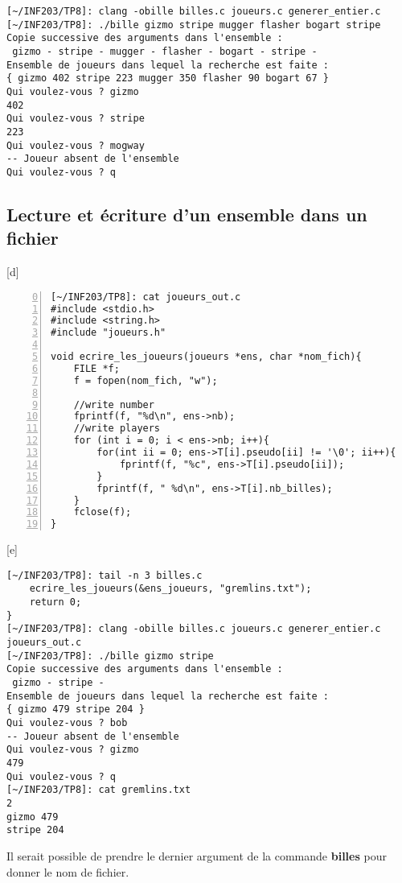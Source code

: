 \documentclass[12pt,a4paper,notitlepage,colorinlistoftodos]{article}
\begin{document}
\begin{lstlisting}
[~/INF203/TP8]: clang -obille billes.c joueurs.c generer_entier.c
[~/INF203/TP8]: ./bille gizmo stripe mugger flasher bogart stripe
Copie successive des arguments dans l'ensemble :
 gizmo - stripe - mugger - flasher - bogart - stripe -
Ensemble de joueurs dans lequel la recherche est faite :
{ gizmo 402 stripe 223 mugger 350 flasher 90 bogart 67 }
Qui voulez-vous ? gizmo
402
Qui voulez-vous ? stripe
223
Qui voulez-vous ? mogway
-- Joueur absent de l'ensemble
Qui voulez-vous ? q
\end{lstlisting}


\subsection*{Lecture et écriture d'un ensemble dans un fichier}

[d]
\begin{lstlisting}[numbers=left, firstnumber = 0 ]
[~/INF203/TP8]: cat joueurs_out.c
#include <stdio.h>
#include <string.h>
#include "joueurs.h"

void ecrire_les_joueurs(joueurs *ens, char *nom_fich){
    FILE *f;
    f = fopen(nom_fich, "w");

    //write number
    fprintf(f, "%d\n", ens->nb);
    //write players
    for (int i = 0; i < ens->nb; i++){
        for(int ii = 0; ens->T[i].pseudo[ii] != '\0'; ii++){
            fprintf(f, "%c", ens->T[i].pseudo[ii]);
        }
        fprintf(f, " %d\n", ens->T[i].nb_billes);
    }
    fclose(f);
}
\end{lstlisting}

[e]
\begin{lstlisting}
[~/INF203/TP8]: tail -n 3 billes.c
    ecrire_les_joueurs(&ens_joueurs, "gremlins.txt");
    return 0;
}
[~/INF203/TP8]: clang -obille billes.c joueurs.c generer_entier.c joueurs_out.c
[~/INF203/TP8]: ./bille gizmo stripe
Copie successive des arguments dans l'ensemble :
 gizmo - stripe -
Ensemble de joueurs dans lequel la recherche est faite :
{ gizmo 479 stripe 204 }
Qui voulez-vous ? bob
-- Joueur absent de l'ensemble
Qui voulez-vous ? gizmo
479
Qui voulez-vous ? q
[~/INF203/TP8]: cat gremlins.txt 
2
gizmo 479
stripe 204
\end{lstlisting}

Il serait possible de prendre le dernier argument de la commande \textbf{billes} pour donner le nom de fichier. 
\end{document}
